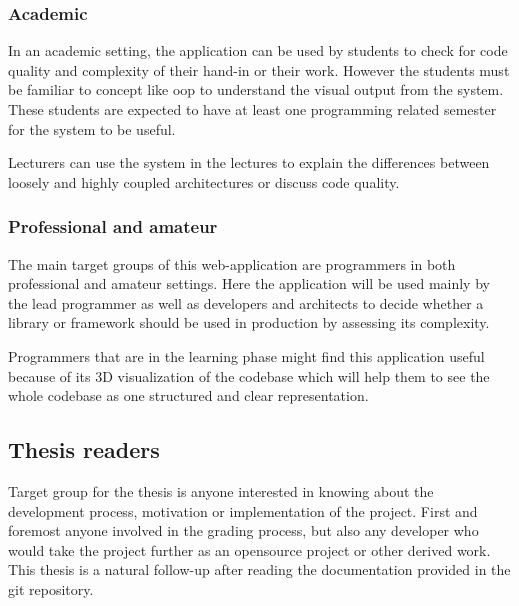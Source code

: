 \subsubsection{Academic}
In an academic setting, the application can be used by students to check for code quality and complexity of their hand-in or their work. However the students must be familiar to concept like \gls{oop} to understand the visual output from the system. These students are expected to have at least one programming related semester for the system to be useful. 

Lecturers can use the system in the lectures to explain the differences between loosely and highly coupled architectures or discuss code quality.

\subsubsection{Professional and amateur}
The main target groups of this web-application are programmers in both professional and amateur settings. Here the application will be used mainly by the lead programmer as well as developers and architects to decide whether a library or framework should be used in production by assessing its complexity. 

Programmers that are in the learning phase might find this application useful because of its 3D visualization of the codebase which will help them to see the whole codebase as one structured and clear representation.

\subsection{Thesis readers}
Target group for the thesis is anyone interested in knowing about the development process, motivation or implementation of the project. First and foremost anyone involved in the grading process, but also any developer who would take the project further as an \gls{opensource} project or other derived work.
This thesis is a natural follow-up after reading the documentation provided in the \gls{git} repository.

